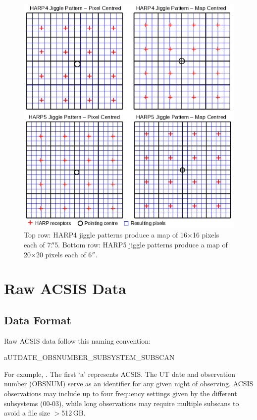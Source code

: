 \documentclass[11pt,oneside,chapters]{starlink}
\providecommand{\arcm}{\si{\arcminute}}%
\providecommand{\arcsec}{\si{\arcsecond}}%
\providecommand{\uarcs}{\hspace{-0.27em}\arcsec\hspace{-0.07em}}
\begin{document}
\begin{figure}[b!]
\begin{center}
\includegraphics[width=0.8\linewidth]{sc20_jiggles}
\caption[HARP4 and HARP5 jiggle patterns]{Top row: HARP4 jiggle
patterns produce a map of 16$\times$16 pixels each of 7.$\uarcs$5. Bottom
row: HARP5 jiggle patterns produce a map of 20$\times$20 pixels each
of 6$\arcsec$. }
\label{fig:jiggle}
\end{center}
\end{figure}

\clearpage

\chapter{Raw ACSIS Data}
\label{sec:raw}

\section{Data Format}
Raw ACSIS data follow this naming convention:

aUTDATE\_OBSNUMBER\_SUBSYSTEM\_SUBSCAN

For example, . The first `a' represents
ACSIS. The UT date and observation number (OBSNUM) serve as an
identifier for any given night of observing. ACSIS observations may
include up to four frequency settings given by the different
subsystems (00-03), while long observations may require multiple
subscans to avoid a file size $>$512\,GB.
\end{document}
